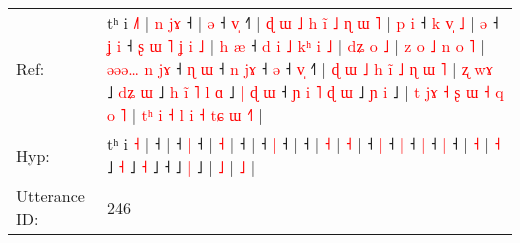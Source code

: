 \documentclass[10pt]{article}
\DeclareRobustCommand{\hl}[1]{{\textcolor{red}{#1}}}
\begin{document}
\begin{longtable}{ll}
Ref: & tʰ i \hl{˩}\hl{˥} |\hl{ }\hl{n}\hl{ }\hl{j}\hl{ɤ} ˧ |\hl{ }\hl{ə} ˧ \hl{v}\hl{̩} ˧\hl{˥} |\hl{ }\hl{ɖ}\hl{ }\hl{ɯ}\hl{ }\hl{˩}\hl{ }\hl{h}\hl{ }\hl{i}\hl{̃}\hl{ }\hl{˩}\hl{ }\hl{ɳ}\hl{ }\hl{ɯ} \hl{˥} |\hl{ }\hl{p}\hl{ }\hl{i} ˧\hl{ }\hl{k}\hl{ }\hl{v}\hl{̩}\hl{ }\hl{˩} |\hl{ }\hl{ə} ˧\hl{ }\hl{ʝ} \hl{i} ˧\hl{ }\hl{ʂ}\hl{ }\hl{ɯ}\hl{ }\hl{˥}\hl{ }\hl{ʝ}\hl{ }\hl{i}\hl{ }\hl{˩} |\hl{ }\hl{h}\hl{ }\hl{æ} ˧\hl{ }\hl{d}\hl{ }\hl{i}\hl{ }\hl{˩}\hl{ }\hl{k}\hl{ʰ}\hl{ }\hl{i}\hl{ }\hl{˩} |\hl{ }\hl{d}\hl{ʑ}\hl{ }\hl{o} \hl{˩} |\hl{ }\hl{z}\hl{ }\hl{o}\hl{ }\hl{˩}\hl{ }\hl{n}\hl{ }\hl{o} \hl{˥} |\hl{ }\hl{ə}\hl{ə}\hl{ə}\hl{…}\hl{ }\hl{n}\hl{ }\hl{j}\hl{ɤ} ˧\hl{ }\hl{ɳ} \hl{ɯ} ˧\hl{ }\hl{n} \hl{j}\hl{ɤ} ˧ \hl{ə} ˧ \hl{v}\hl{̩} ˧\hl{˥} |\hl{ }\hl{ɖ}\hl{ }\hl{ɯ}\hl{ }\hl{˩}\hl{ }\hl{h}\hl{ }\hl{i}\hl{̃}\hl{ }\hl{˩}\hl{ }\hl{ɳ}\hl{ }\hl{ɯ} \hl{˥} |\hl{ }\hl{ʐ} \hl{w}\hl{ɤ} ˩\hl{ }\hl{d}\hl{ʑ} \hl{ɯ} ˩\hl{ }\hl{h}\hl{ }\hl{i}\hl{̃}\hl{ }\hl{˥}\hl{ }\hl{l} \hl{ɑ} ˩\hl{ }\hl{|}\hl{ }\hl{ɖ}\hl{ }\hl{ɯ} ˧\hl{ }\hl{ɲ}\hl{ }\hl{i}\hl{ }\hl{˥}\hl{ }\hl{ɖ}\hl{ }\hl{ɯ} ˩\hl{ }\hl{ɲ} \hl{i} ˩ |\hl{ }\hl{t}\hl{ }\hl{j}\hl{ɤ}\hl{ }\hl{˧}\hl{ }\hl{ʂ}\hl{ }\hl{ɯ}\hl{ }\hl{˧}\hl{ }\hl{q}\hl{ }\hl{o} \hl{˥} |\hl{ }\hl{t}\hl{ʰ}\hl{ }\hl{i}\hl{ }\hl{˧}\hl{ }\hl{l}\hl{ }\hl{i}\hl{ }\hl{˧}\hl{ }\hl{t}\hl{ɕ}\hl{ }\hl{ɯ} \hl{˧}\hl{˥} |
 \\
Hyp: & tʰ i \hl{}\hl{˧} |\hl{}\hl{}\hl{}\hl{}\hl{} ˧ |\hl{}\hl{} ˧ \hl{}\hl{|} ˧\hl{} |\hl{}\hl{}\hl{}\hl{}\hl{}\hl{}\hl{}\hl{}\hl{}\hl{}\hl{}\hl{}\hl{}\hl{}\hl{}\hl{}\hl{} \hl{˧} |\hl{}\hl{}\hl{}\hl{} ˧\hl{}\hl{}\hl{}\hl{}\hl{}\hl{}\hl{} |\hl{}\hl{} ˧\hl{}\hl{} \hl{|} ˧\hl{}\hl{}\hl{}\hl{}\hl{}\hl{}\hl{}\hl{}\hl{}\hl{}\hl{}\hl{} |\hl{}\hl{}\hl{}\hl{} ˧\hl{}\hl{}\hl{}\hl{}\hl{}\hl{}\hl{}\hl{}\hl{}\hl{}\hl{}\hl{}\hl{} |\hl{}\hl{}\hl{}\hl{}\hl{} \hl{˧} |\hl{}\hl{}\hl{}\hl{}\hl{}\hl{}\hl{}\hl{}\hl{}\hl{} \hl{˧} |\hl{}\hl{}\hl{}\hl{}\hl{}\hl{}\hl{}\hl{}\hl{}\hl{} ˧\hl{}\hl{} \hl{|} ˧\hl{}\hl{} \hl{}\hl{|} ˧ \hl{|} ˧ \hl{}\hl{|} ˧\hl{} |\hl{}\hl{}\hl{}\hl{}\hl{}\hl{}\hl{}\hl{}\hl{}\hl{}\hl{}\hl{}\hl{}\hl{}\hl{}\hl{}\hl{} \hl{˧} |\hl{}\hl{} \hl{}\hl{˧} ˩\hl{}\hl{}\hl{} \hl{˧} ˩\hl{}\hl{}\hl{}\hl{}\hl{}\hl{}\hl{}\hl{}\hl{} \hl{˧} ˩\hl{}\hl{}\hl{}\hl{}\hl{}\hl{} ˧\hl{}\hl{}\hl{}\hl{}\hl{}\hl{}\hl{}\hl{}\hl{}\hl{} ˩\hl{}\hl{} \hl{|} ˩ |\hl{}\hl{}\hl{}\hl{}\hl{}\hl{}\hl{}\hl{}\hl{}\hl{}\hl{}\hl{}\hl{}\hl{}\hl{}\hl{}\hl{} \hl{˩} |\hl{}\hl{}\hl{}\hl{}\hl{}\hl{}\hl{}\hl{}\hl{}\hl{}\hl{}\hl{}\hl{}\hl{}\hl{}\hl{}\hl{}\hl{} \hl{}\hl{˩} |
 \\
\midrule
Utterance ID: & 246 \\

\end{longtable}
\end{document}
